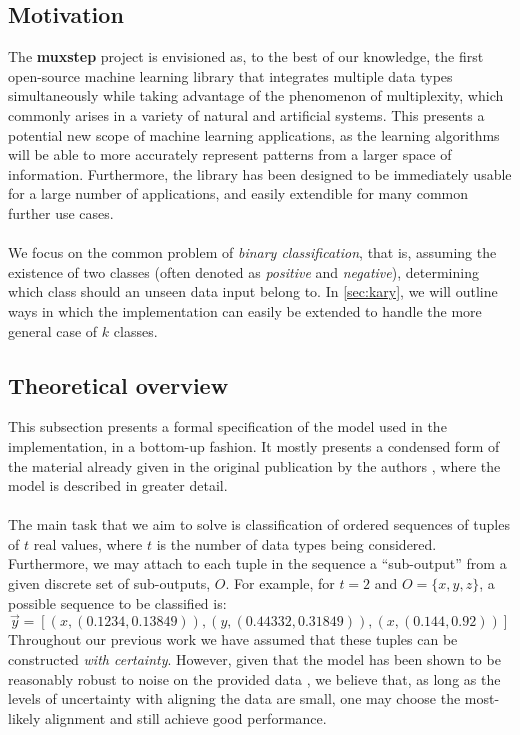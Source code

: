 \documentclass[12pt,openany]{article}
\begin{document}
	\subsection{Motivation}
	
	The {\bf muxstep} project is envisioned as, to the best of our knowledge, the first open-source machine learning library that integrates multiple data types simultaneously while taking advantage of the phenomenon of multiplexity, which commonly arises in a variety of natural and artificial systems. This presents a potential new scope of machine learning applications, as the learning algorithms will be able to more accurately represent patterns from a larger space of information. Furthermore, the library has been designed to be immediately usable for a large number of applications, and easily extendible for many common further use cases.\\ \\
	We focus on the common problem of \emph{binary classification}, that is, assuming the existence of two classes (often denoted as \emph{positive} and \emph{negative}), determining which class should an unseen data input belong to. In \cref{sec:kary}, we will outline ways in which the implementation can easily be extended to handle the more general case of $k$ classes.
	
	\subsection{Theoretical overview}\label{sec:theory}
	
	This subsection presents a formal specification of the model used in the implementation, in a bottom-up fashion. It mostly presents a condensed form of the material already given in the original publication by the authors \cite{Velickovic15}, where the model is described in greater detail.\\ \\ The main task that we aim to solve is classification of ordered sequences of tuples of $t$ real values, where $t$ is the number of data types being considered. Furthermore, we may attach to each tuple in the sequence a ``sub-output'' from a given discrete set of sub-outputs, $O$. For example, for $t = 2$ and $O = \{x, y, z\}$, a possible sequence to be classified is:
	\begin{equation}
		\vec{y} = \left[\left(x, \left(0.1234, 0.13849\right)\right), \left(y, \left(0.44332, 0.31849\right)\right), \left(x, \left(0.144, 0.92\right)\right)\right]
	\end{equation}
	Throughout our previous work we have assumed that these tuples can be constructed \emph{with certainty}. However, given that the model has been shown to be reasonably robust to noise on the provided data \cite{Velickovic15}, we believe that, as long as the levels of uncertainty with aligning the data are small, one may choose the most-likely alignment and still achieve good performance.
	
\end{document}

